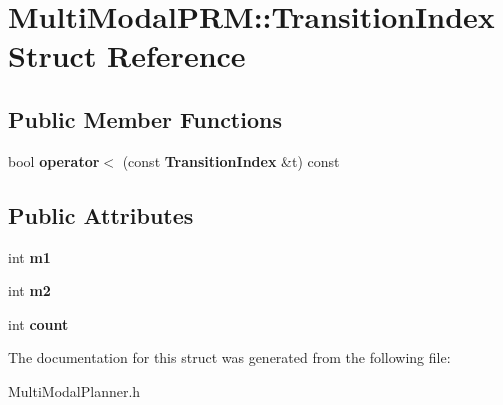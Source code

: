 \section{Multi\+Modal\+P\+RM\+:\+:Transition\+Index Struct Reference}
\label{structMultiModalPRM_1_1TransitionIndex}
\subsection*{Public Member Functions}
\begin{DoxyCompactItemize}
\item 
bool {\bfseries operator$<$} (const {\bf Transition\+Index} \&t) const \label{structMultiModalPRM_1_1TransitionIndex_aa4ed901b786c7946500ce3f173c7ac07}

\end{DoxyCompactItemize}
\subsection*{Public Attributes}
\begin{DoxyCompactItemize}
\item 
int {\bfseries m1}\label{structMultiModalPRM_1_1TransitionIndex_a73f1ab9308d7ce35202f1980e9c72a0a}

\item 
int {\bfseries m2}\label{structMultiModalPRM_1_1TransitionIndex_a40b64be69191129772a1660a8caa419d}

\item 
int {\bfseries count}\label{structMultiModalPRM_1_1TransitionIndex_a191f1df07cce02ad6127bc8423b4a881}

\end{DoxyCompactItemize}


The documentation for this struct was generated from the following file\+:\begin{DoxyCompactItemize}
\item 
Multi\+Modal\+Planner.\+h\end{DoxyCompactItemize}
